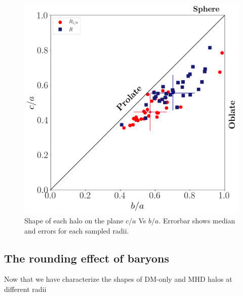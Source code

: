 \documentclass[a4paper,fleqn,usenatbib]{mnras}
\begin{document}
\begin{figure}
  \centering
 \includegraphics[width=0.9\columnwidth]{./pics/Triaxial_Plane/Triax_DM.png}
  
  \hfill
  \caption{Shape of each halo on the plane $c/a$ Vs $b/a$. Errorbar shows median and errors for each sampled radii. }
  \label{fig:Triax_DM}
\end{figure}

\subsection{The rounding effect of baryons}
Now that we have characterize the shapes of DM-only and MHD halos at different radii 
\end{document}
